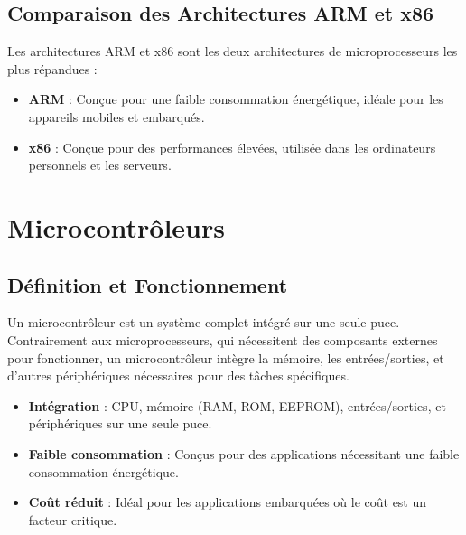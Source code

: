 \documentclass[10pt,a4paper]{article}
\begin{document}

\subsection*{Comparaison des Architectures ARM et x86}

Les architectures ARM et x86 sont les deux architectures de microprocesseurs les plus répandues :
\begin{itemize}
    \item \textbf{ARM} : Conçue pour une faible consommation énergétique, idéale pour les appareils mobiles et embarqués.
    \item \textbf{x86} : Conçue pour des performances élevées, utilisée dans les ordinateurs personnels et les serveurs.
\end{itemize}


\section*{Microcontrôleurs}

\subsection*{Définition et Fonctionnement}

Un microcontrôleur est un système complet intégré sur une seule puce. Contrairement aux microprocesseurs, qui nécessitent des composants externes pour fonctionner, un microcontrôleur intègre la mémoire, les entrées/sorties, et d'autres périphériques nécessaires pour des tâches spécifiques.

\begin{itemize}
    \item \textbf{Intégration} : CPU, mémoire (RAM, ROM, EEPROM), entrées/sorties, et périphériques sur une seule puce.
    \item \textbf{Faible consommation} : Conçus pour des applications nécessitant une faible consommation énergétique.
    \item \textbf{Coût réduit} : Idéal pour les applications embarquées où le coût est un facteur critique.
\end{itemize}
\end{document}
